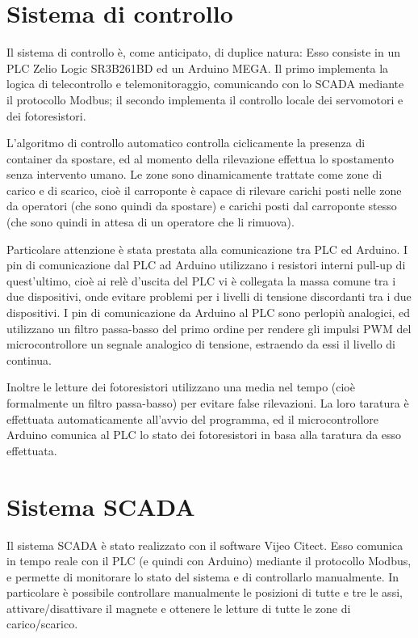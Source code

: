 \section{Sistema di controllo}

Il sistema di controllo è, come anticipato, di duplice natura: Esso consiste in un PLC Zelio Logic
SR3B261BD ed un Arduino MEGA. Il primo implementa la logica di telecontrollo e
telemonitoraggio, comunicando con lo SCADA mediante il protocollo Modbus; il secondo implementa il
controllo locale dei servomotori e dei fotoresistori.

L'algoritmo di controllo automatico controlla ciclicamente la presenza di container da spostare, ed
al momento della rilevazione effettua lo spostamento senza intervento umano. Le zone sono
dinamicamente trattate come zone di carico e di scarico, cioè il carroponte è capace di rilevare
carichi posti nelle zone da operatori (che sono quindi da spostare) e carichi posti dal carroponte
stesso (che sono quindi in attesa di un operatore che li rimuova).

Particolare attenzione è stata prestata alla comunicazione tra PLC ed Arduino. I pin di
comunicazione dal PLC ad Arduino utilizzano i resistori interni pull-up di quest'ultimo, cioè ai
relè d'uscita del PLC vi è collegata la massa comune tra i due dispositivi, onde evitare problemi
per i livelli di tensione discordanti tra i due dispositivi. I pin di comunicazione da Arduino al
PLC sono perlopiù analogici, ed utilizzano un filtro passa-basso del primo ordine per rendere gli
impulsi PWM del microcontrollore un segnale analogico di tensione, estraendo da essi il livello di
continua.

Inoltre le letture dei fotoresistori utilizzano una media nel tempo (cioè formalmente un filtro
passa-basso) per evitare false rilevazioni. La loro taratura è effettuata automaticamente all'avvio
del programma, ed il microcontrollore Arduino comunica al PLC lo stato dei fotoresistori in basa
alla taratura da esso effettuata.

\section{Sistema SCADA}

Il sistema SCADA è stato realizzato con il software Vijeo Citect. Esso comunica in tempo reale con
il PLC (e quindi con Arduino) mediante il protocollo Modbus, e permette di monitorare lo stato del
sistema e di controllarlo manualmente. In particolare è possibile controllare manualmente le
posizioni di tutte e tre le assi, attivare/disattivare il magnete e ottenere le letture di tutte le
zone di carico/scarico.

